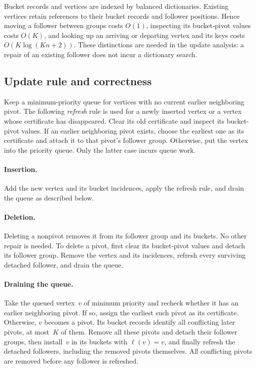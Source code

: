 \documentclass[11pt,letterpaper]{article}
\theoremstyle{definition}
\theoremstyle{remark}
\newcommand{\1}{\mathbf{1}}
\begin{document}
Bucket records and vertices are indexed by balanced dictionaries.  Existing vertices retain references to their bucket records and follower positions.  Hence moving a follower between groups costs $O(1)$, inspecting its bucket-pivot values costs $O(K)$, and looking up an arriving or departing vertex and its keys costs $O(K\log(Kn+2))$.  These distinctions are needed in the update analysis: a repair of an existing follower does not incur a dictionary search.

\subsection{Update rule and correctness}

Keep a minimum-priority queue for vertices with no current earlier neighboring pivot.  The following \emph{refresh} rule is used for a newly inserted vertex or a vertex whose certificate has disappeared.  Clear its old certificate and inspect its bucket-pivot values.  If an earlier neighboring pivot exists, choose the earliest one as its certificate and attach it to that pivot's follower group.  Otherwise, put the vertex into the priority queue.  Only the latter case incurs queue work.

\paragraph{Insertion.}
Add the new vertex and its bucket incidences, apply the refresh rule, and drain the queue as described below.

\paragraph{Deletion.}
Deleting a nonpivot removes it from its follower group and its buckets.  No other repair is needed.  To delete a pivot, first clear its bucket-pivot values and detach its follower group.  Remove the vertex and its incidences, refresh every surviving detached follower, and drain the queue.

\paragraph{Draining the queue.}
Take the queued vertex~$v$ of minimum priority and recheck whether it has an earlier neighboring pivot.  If so, assign the earliest such pivot as its certificate.  Otherwise, $v$ becomes a pivot.  Its bucket records identify all conflicting later pivots, at most~$K$ of them.  Remove all these pivots and detach their follower groups, then install~$v$ in its buckets with $\ell(v)=v$, and finally refresh the detached followers, including the removed pivots themselves.  All conflicting pivots are removed before any follower is refreshed.
\end{document}
